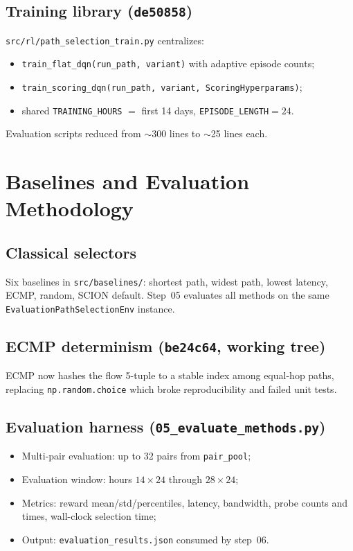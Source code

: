 \documentclass[11pt,a4paper,twoside,openright]{report}
\begin{document}
\section{Training library (\texttt{de50858})}

\texttt{src/rl/path\_selection\_train.py} centralizes:
\begin{itemize}
  \item \texttt{train\_flat\_dqn(run\_path, variant)} with adaptive episode counts;
  \item \texttt{train\_scoring\_dqn(run\_path, variant, ScoringHyperparams)};
  \item shared \texttt{TRAINING\_HOURS} $=$ first 14 days, \texttt{EPISODE\_LENGTH}${=}24$.
\end{itemize}
Evaluation scripts reduced from $\sim$300 lines to $\sim$25 lines each.

\chapter{Baselines and Evaluation Methodology}

\section{Classical selectors}

Six baselines in \texttt{src/baselines/}: shortest path, widest path, lowest latency,
ECMP, random, SCION default. Step~05 evaluates all methods on the same
\texttt{EvaluationPathSelectionEnv} instance.

\section{ECMP determinism (\texttt{be24c64}, working tree)}

ECMP now hashes the flow 5-tuple to a stable index among equal-hop paths, replacing
\texttt{np.random.choice} which broke reproducibility and failed unit tests.

\section{Evaluation harness (\texttt{05\_evaluate\_methods.py})}

\begin{itemize}
  \item Multi-pair evaluation: up to 32 pairs from \texttt{pair\_pool};
  \item Evaluation window: hours $14 \times 24$ through $28 \times 24$;
  \item Metrics: reward mean/std/percentiles, latency, bandwidth, probe counts and times,
    wall-clock selection time;
  \item Output: \texttt{evaluation\_results.json} consumed by step~06.
\end{itemize}
\end{document}
